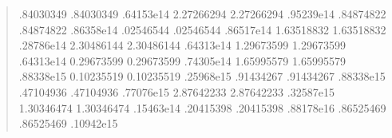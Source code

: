 \documentclass[letterpaper,10pt,english]{sphinxmanual}
\begin{document}
\begin{enumerate}
\begin{quote}
\begin{sphinxVerbatim}[commandchars=\\\{\}]
     .84030349           .84030349  .64153e\PYGZhy{}14 
    \PYGZhy{}2.27266294          \PYGZhy{}2.27266294  .95239e\PYGZhy{}14 
     .84874822           .84874822  .86358e\PYGZhy{}14 
     .02546544           .02546544  .86517e\PYGZhy{}14 
    \PYGZhy{}1.63518832          \PYGZhy{}1.63518832  .28786e\PYGZhy{}14 
    \PYGZhy{}2.30486144          \PYGZhy{}2.30486144  .64313e\PYGZhy{}14 
    \PYGZhy{}1.29673599          \PYGZhy{}1.29673599  .64313e\PYGZhy{}14 
    \PYGZhy{}0.29673599          \PYGZhy{}0.29673599  .74305e\PYGZhy{}14 
    \PYGZhy{}1.65995579          \PYGZhy{}1.65995579  .88338e\PYGZhy{}15 
    \PYGZhy{}0.10235519          \PYGZhy{}0.10235519  .25968e\PYGZhy{}15 
     .91434267           .91434267  .88338e\PYGZhy{}15 
     .47104936           .47104936  .77076e\PYGZhy{}15 
    \PYGZhy{}2.87642233          \PYGZhy{}2.87642233  .32587e\PYGZhy{}15 
    \PYGZhy{}1.30346474          \PYGZhy{}1.30346474  .15463e\PYGZhy{}14 
     .20415398           .20415398  .88178e\PYGZhy{}16 
     .86525469           .86525469  .10942e\PYGZhy{}15 

\end{sphinxVerbatim}
\end{quote}
\end{enumerate}
\end{document}
